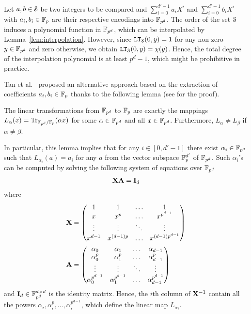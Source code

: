   Let $a,b \in \S$ be two integers to be compared and $\sum_{i=0}^{d'-1} a_i X^i$ and $\sum_{i=0}^{d'-1} b_i X^i$ with $a_i, b_i \in \F_p$ are their respective encodings into $\F_{p^d}$.
  The order of the set $\S$ induces a polynomial function in $\F_{p^d}$, which can be interpolated by Lemma~\ref{lem:interpolation}.
  However, since $\LT_\S(0,y) = 1$ for any non-zero $y \in \F_{p^d}$ and zero otherwise, we obtain $\LT_\S(0,y) = \chi(y)$.
  Hence, the total degree of the interpolation polynomial is at least $p^d-1$, 
  which might be prohibitive in practice.

  Tan et al.~\cite{TLWRK20} proposed an alternative approach based on the extraction of coefficients $a_i, b_i \in \F_p$ thanks to the following lemma (see \cite[Theorem 2.24]{LN86} for the proof).
  \begin{lemma}\label{lem:extraction}
    The linear transformations from $\F_{p^d}$ to $\F_p$ are exactly the mappings $L_{\alpha}(x) = \Tr_{\F_{p^d}/\F_p}(\alpha x)$ for some $\alpha \in \F_{p^d}$ and all $x \in \F_{p^d}$.
    Furthermore, $L_{\alpha} \ne L_{\beta}$ if $\alpha \ne \beta$.
  \end{lemma}
  In particular, this lemma implies that for any $i \in [0,d'-1]$ there exist $\alpha_i \in \F_{p^d}$ such that $L_{\alpha_i}(a) = a_i$ for any $a$ from the vector subspace $\F_p^{d'}$ of $\F_{p^d}$.
  Such $\alpha_i$'s can be computed by solving the following system of equations over $\F_{p^d}$ 
  \begin{align*}
    \mX \mA
    =
    \mI_{d}
  \end{align*}
  where
  \begin{align*}
  \mX &= \begin{pmatrix}
      1       & 1       & \dots   & 1             \\
      x       & x^p     & \dots   & x^{p^{d-1}}   \\
      \vdots  & \vdots  & \ddots  & \vdots        \\
      x^{d-1}     & x^{(d-1)p}    & \dots   & x^{(d-1)p^{d-1}}  \\
    \end{pmatrix}
    \\
    \mA &= \begin{pmatrix}
      \alpha_0      & \alpha_1      & \dots   & \alpha_{d-1}      \\
      \alpha_0^{p}  & \alpha_1^{p}  & \dots   & \alpha_{d-1}^{p}  \\
      \vdots        & \vdots        & \ddots  & \vdots            \\
      \alpha_0^{p^{d-1}}  & \alpha_1^{p^{d-1}}  & \dots   & \alpha_{d-1}^{p^{d-1}}  \\
    \end{pmatrix}
  \end{align*}
  and $\mI_d \in \F_{p^d}^{d \times d}$ is the identity matrix.
  Hence, the $i$th column of $\inv{\mX}$ contain all the powers $\alpha_i, \alpha_i^p, \dots, \alpha_i^{p^{d-1}}$, which define the linear map $L_{\alpha_i}$.


